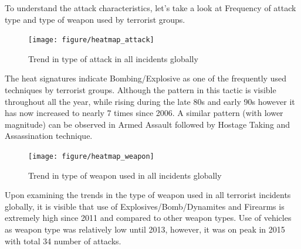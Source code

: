 \documentclass[11pt,oneside,a4paper]{reedthesis}
\newenvironment{Shaded}{\begin{snugshade}}{\end{snugshade}}
\newcommand{\KeywordTok}[1]{\textcolor[rgb]{0.13,0.29,0.53}{\textbf{#1}}}
\newcommand{\DataTypeTok}[1]{\textcolor[rgb]{0.13,0.29,0.53}{#1}}
\newcommand{\StringTok}[1]{\textcolor[rgb]{0.31,0.60,0.02}{#1}}
\newcommand{\OperatorTok}[1]{\textcolor[rgb]{0.81,0.36,0.00}{\textbf{#1}}}
\newcommand{\NormalTok}[1]{#1}
\begin{document}
To understand the attack characteristics, let's take a look at Frequency
of attack type and type of weapon used by terrorist groups.
\begin{Shaded}
\end{Shaded}
\begin{figure}
\texttt{[image: figure/heatmap\_attack]} \caption{Trend in type of attack in all incidents globally}\label{fig:unnamed-chunk-5}
\end{figure}
The heat signatures indicate Bombing/Explosive as one of the frequently
used techniques by terrorist groups. Although the pattern in this tactic
is visible throughout all the year, while rising during the late 80s and
early 90s however it has now increased to nearly 7 times since 2006. A
similar pattern (with lower magnitude) can be observed in Armed Assault
followed by Hostage Taking and Assassination technique.
\begin{Shaded}
\end{Shaded}
\begin{figure}
\texttt{[image: figure/heatmap\_weapon]} \caption{Trend in type of weapon used in all incidents globally}\label{fig:unnamed-chunk-7}
\end{figure}
Upon examining the trends in the type of weapon used in all terrorist
incidents globally, it is visible that use of Explosives/Bomb/Dynamites
and Firearms is extremely high since 2011 and compared to other weapon
types. Use of vehicles as weapon type was relatively low until 2013,
however, it was on peak in 2015 with total 34 number of attacks.
\end{document}

